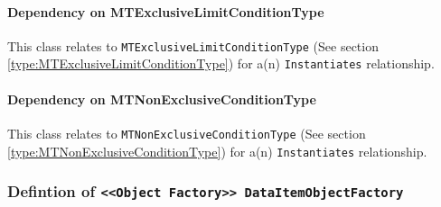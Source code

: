 \paragraph{Dependency on MTExclusiveLimitConditionType}

This class relates to \texttt{MTExclusiveLimitConditionType} (See section \ref{type:MTExclusiveLimitConditionType}) for a(n) \texttt{Instantiates} relationship.

\paragraph{Dependency on MTNonExclusiveConditionType}

This class relates to \texttt{MTNonExclusiveConditionType} (See section \ref{type:MTNonExclusiveConditionType}) for a(n) \texttt{Instantiates} relationship.

\FloatBarrier
\subsubsection{Defintion of \texttt{<<Object Factory>> DataItemObjectFactory}} \label{type:DataItemObjectFactory}

\FloatBarrier



